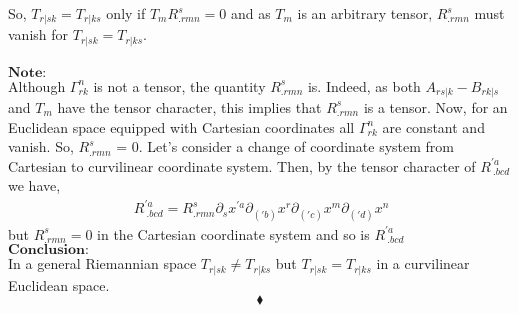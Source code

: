 So, $T_{r|sk} =  T_{r|ks}$ only if $T_m R^s_{.rmn} = 0$ and as $T_m$ is an arbitrary tensor, $R^s_{.rmn}$ must vanish for $T_{r|sk} =  T_{r|ks}$.\\\\
$\textbf{Note:}$\\
Although $\Gamma^n_{rk}$ is not a tensor, the quantity $R^s_{.rmn}$ is. Indeed, as both $A_{rs|k} - B_{rk|s}$ and $ T_m$ have the tensor character, this implies that $R^s_{.rmn}$ is a tensor.
Now, for an Euclidean space equipped with Cartesian coordinates all $\Gamma^n_{rk} $ are constant and vanish. So, $R^s_{.rmn}$ = 0. Let's consider a change of coordinate system from Cartesian to curvilinear coordinate system. Then, by the tensor character of $R^{'a}_{\ .bcd}$ we have,
\begin{align}
\ R^{'a}_{\ .bcd} = R^s_{.rmn}\partial_s x^{'a} \partial_{('b)} x^{r} \partial_{('c)} x^{m} \partial_{('d)} x^{n}
\end{align}
but $R^s_{.rmn} =0$ in the Cartesian coordinate system and so is $R^{'a}_{\ .bcd}$\\
$\textbf{Conclusion:}$\\
In a general Riemannian space $T_{r|sk} \neq  T_{r|ks}$ but $T_{r|sk} =  T_{r|ks}$ in a curvilinear Euclidean space.
$$\blacklozenge$$
\newpage

